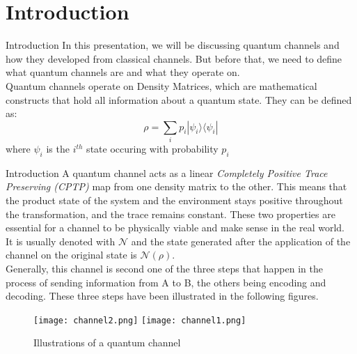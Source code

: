 \section{Introduction}

\begin{frame}{Introduction}
    In this presentation, we will be discussing quantum channels and how they developed from classical channels. But before that, we need to define what quantum channels
    are and what they operate on. \\
    Quantum channels operate on Density Matrices, which are mathematical constructs that hold all information about a quantum state. They can be defined as:
    \begin{equation}
        \rho = \sum_{i}p_i | \psi_i \rangle \langle \psi_i |   
    \end{equation}
    where $\psi_i$ is the $i^{th}$ state occuring with probability $p_i$
\end{frame}

\begin{frame}{Introduction}
    A quantum channel acts as a linear \textit{Completely Positive Trace Preserving (CPTP)} map from one density matrix to the other. This means that the product state
    of the system and the environment stays positive throughout the transformation, and the trace remains constant. These two properties are essential for a channel to
    be physically viable and make sense in the real world.\\
    It is usually denoted with $\mathcal{N}$ and the state generated after the application of the channel on the original state is $\mathcal{N} (\rho)$.\\
    Generally, this channel is second one of the three steps that happen in the process of sending information from A to B, the others being encoding and decoding.
    These three steps have been illustrated in the following figures.
\end{frame}

\begin{frame}
    \begin{figure}
        \texttt{[image: channel2.png]}
        \texttt{[image: channel1.png]}
        \caption{Illustrations of a quantum channel}
    \end{figure}
    
\end{frame}

